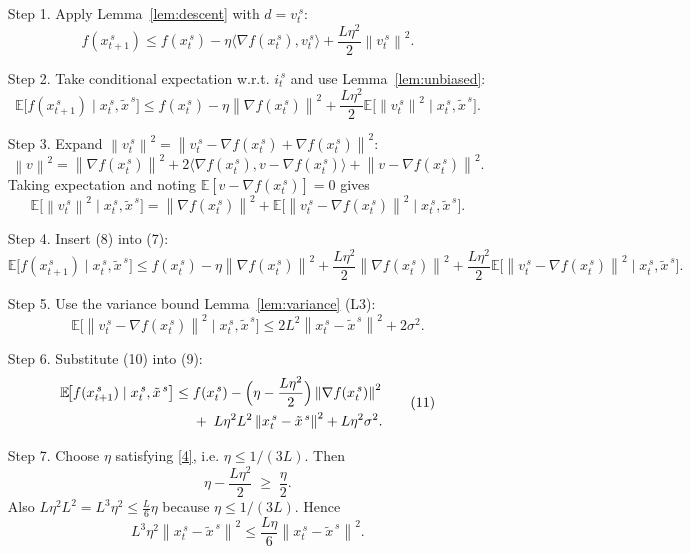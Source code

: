 \documentclass{article}
\newcommand{\E}{\mathbb{E}}
\newcommand{\norm}[1]{\left\|#1\right\|}
\newcommand{\inner}[2]{\langle #1,#2\rangle}
\newcommand{\grad}{\nabla}
\begin{document}
\begin{enumerate}
\item[Step 1.] Apply Lemma~\ref{lem:descent} with $d=v_t^{\,s}$:
\[
f(x_{t+1}^{\,s})\le f(x_t^{\,s})-\eta\inner{\grad f(x_t^{\,s})}{v_t^{\,s}}
+\frac{L\eta^{2}}{2}\norm{v_t^{\,s}}^{2}. \tag{6}
\]

\item[Step 2.] Take conditional expectation w.r.t. $i_t^{\,s}$ and use Lemma~\ref{lem:unbiased}:
\[
\E\!\bigl[f(x_{t+1}^{\,s})\mid x_t^{\,s},\tilde{x}^{\,s}\bigr]
\le f(x_t^{\,s})-\eta\norm{\grad f(x_t^{\,s})}^{2}
+\frac{L\eta^{2}}{2}\E\!\bigl[\norm{v_t^{\,s}}^{2}\mid x_t^{\,s},\tilde{x}^{\,s}\bigr].
\tag{7}
\]

\item[Step 3.] Expand $\norm{v_t^{\,s}}^{2}=\norm{v_t^{\,s}-\grad f(x_t^{\,s})+\grad f(x_t^{\,s})}^{2}$:
\[
\norm{v}^{2}
= \norm{\grad f(x_t^{\,s})}^{2}
+2\inner{\grad f(x_t^{\,s})}{v-\grad f(x_t^{\,s})}
+\norm{v-\grad f(x_t^{\,s})}^{2}.
\]
Taking expectation and noting $\E[v-\grad f(x_t^{\,s})]=0$ gives
\[
\E\!\bigl[\norm{v_t^{\,s}}^{2}\mid x_t^{\,s},\tilde{x}^{\,s}\bigr]
= \norm{\grad f(x_t^{\,s})}^{2}
+ \E\!\bigl[\norm{v_t^{\,s}-\grad f(x_t^{\,s})}^{2}\mid x_t^{\,s},\tilde{x}^{\,s}\bigr].
\tag{8}
\]

\item[Step 4.] Insert (8) into (7):
\[
\E\!\bigl[f(x_{t+1}^{\,s})\mid x_t^{\,s},\tilde{x}^{\,s}\bigr]
\le f(x_t^{\,s})-\eta\norm{\grad f(x_t^{\,s})}^{2}
+\frac{L\eta^{2}}{2}\norm{\grad f(x_t^{\,s})}^{2}
+\frac{L\eta^{2}}{2}\E\!\bigl[\norm{v_t^{\,s}-\grad f(x_t^{\,s})}^{2}\mid x_t^{\,s},\tilde{x}^{\,s}\bigr].
\tag{9}
\]

\item[Step 5.] Use the variance bound Lemma~\ref{lem:variance} (L3):
\[
\E\!\bigl[\norm{v_t^{\,s}-\grad f(x_t^{\,s})}^{2}\mid x_t^{\,s},\tilde{x}^{\,s}\bigr]
\le 2L^{2}\norm{x_t^{\,s}-\tilde{x}^{\,s}}^{2}+2\sigma^{2}.
\tag{10}
\]

\item[Step 6.] Substitute (10) into (9):
\[
\begin{aligned}
\E\!\bigl[f(x_{t+1}^{\,s})\mid x_t^{\,s},\tilde{x}^{\,s}\bigr]
\le\;& f(x_t^{\,s})
-\Bigl(\eta-\frac{L\eta^{2}}{2}\Bigr)\norm{\grad f(x_t^{\,s})}^{2}\\
&+\;L\eta^{2}L^{2}\norm{x_t^{\,s}-\tilde{x}^{\,s}}^{2}
+L\eta^{2}\sigma^{2}.
\end{aligned}
\tag{11}
\]

\item[Step 7.] Choose $\eta$ satisfying \eqref{4}, i.e. $\eta\le 1/(3L)$. Then
\[
\eta-\frac{L\eta^{2}}{2}\;\ge\;\frac{\eta}{2}.
\tag{12}
\]
Also $L\eta^{2}L^{2}=L^{3}\eta^{2}\le \frac{L}{6}\eta$ because $\eta\le 1/(3L)$. Hence
\[
L^{3}\eta^{2}\norm{x_t^{\,s}-\tilde{x}^{\,s}}^{2}
\le \frac{L\eta}{6}\norm{x_t^{\,s}-\tilde{x}^{\,s}}^{2}.
\tag{13}
\]


\end{enumerate}
\end{document}
